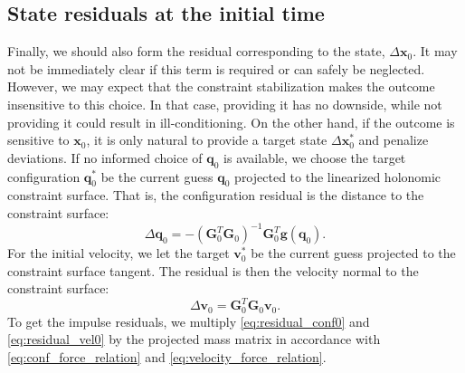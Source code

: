 \documentclass[preprint,12pt]{elsarticle}
\let\vec\bm
\let\mat\mathbf
\numberwithin{equation}{section}
\begin{document}
\subsection{State residuals at the initial time}
Finally, we should also form the residual corresponding to the state, $\Delta \vec{x}_0$.
It may not be immediately clear if this term is required or can safely be neglected.
However, we may expect that the constraint stabilization makes the outcome insensitive to this choice.
In that case, providing it has no downside, while not providing it could result in ill-conditioning.
On the other hand, if the outcome is sensitive to $\vec{x}_0$, it is only natural to provide a target state $\Delta \vec{x}_0^*$ and penalize deviations.
If no informed choice of $\vec{q}_0$ is available, we choose the target configuration $\vec{q}_0^*$ be the current guess $\vec{q}_0$ projected to the linearized holonomic constraint surface.
That is, the configuration residual is the distance to the constraint surface:
\begin{equation}
    \label{eq:residual_conf0}
    \Delta \vec{q}_0 = -(\mat{G}_0^T \mat{G}_0)^{-1} \mat{G}_0^T \vec{g}(\vec{q}_0).
\end{equation}
For the initial velocity, we let the target $\vec{v}_0^*$ be the current guess projected to the constraint surface tangent.
The residual is then the velocity normal to the constraint surface:
\begin{equation}
    \label{eq:residual_vel0}
    \Delta \vec{v}_0 = \mat{G}_0^T \mat{G}_0 \vec{v}_0.
\end{equation}
To get the impulse residuals, we multiply \eqref{eq:residual_conf0} and \eqref{eq:residual_vel0} by the projected mass matrix in accordance with \eqref{eq:conf_force_relation} and \eqref{eq:velocity_force_relation}.
\end{document}
